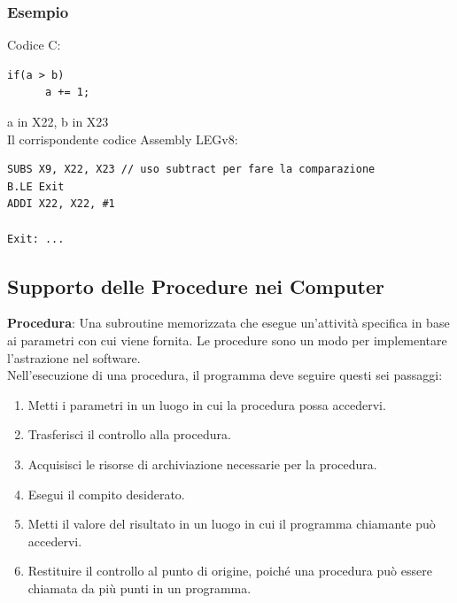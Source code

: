 \documentclass[12pt,a4paper]{article}
\begin{document}
\subsubsection{Esempio}
Codice C:
\begin{center}
\begin{minipage}{.4\linewidth}
\begin{verbatim}
if(a > b)
      a += 1;
\end{verbatim}
\end{minipage}
\end{center}
a in X22, b in X23\\
Il corrispondente codice Assembly LEGv8:
\begin{verbatim}
SUBS X9, X22, X23 // uso subtract per fare la comparazione
B.LE Exit
ADDI X22, X22, #1

Exit: ...
\end{verbatim}

\subsection{Supporto delle Procedure nei Computer}
\textbf{Procedura}: Una subroutine memorizzata che esegue un'attività specifica in base ai parametri con cui viene fornita. Le procedure sono un modo per implementare l'astrazione nel software.\\
Nell'esecuzione di una procedura, il programma deve seguire questi sei passaggi:
\begin{enumerate}
\item Metti i parametri in un luogo in cui la procedura possa accedervi.
\item Trasferisci il controllo alla procedura.
\item Acquisisci le risorse di archiviazione necessarie per la procedura.
\item Esegui il compito desiderato.
\item Metti il valore del risultato in un luogo in cui il programma chiamante può accedervi.
\item Restituire il controllo al punto di origine, poiché una procedura può essere chiamata da più punti in un programma.
\end{enumerate}
\end{document}

